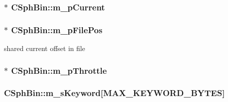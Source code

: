 \hypertarget{structCSphBin_a2cbc4fc1ca50a07597654190a3209dcf}{
\subsubsection[{m\-\_\-p\-Current}]{$\ast$ C\-Sph\-Bin\-::m\-\_\-p\-Current\hspace{0.3cm}{\ttfamily [protected]}}}\label{structCSphBin_a2cbc4fc1ca50a07597654190a3209dcf}
\hypertarget{structCSphBin_acfd4d417ade3bda7c77436723a9654ec}{
\subsubsection[{m\-\_\-p\-File\-Pos}]{$\ast$ C\-Sph\-Bin\-::m\-\_\-p\-File\-Pos\hspace{0.3cm}{\ttfamily [protected]}}}\label{structCSphBin_acfd4d417ade3bda7c77436723a9654ec}


shared current offset in file 

\hypertarget{structCSphBin_ad11523bd78eae596117257d4556a1773}{
\subsubsection[{m\-\_\-p\-Throttle}]{$\ast$ C\-Sph\-Bin\-::m\-\_\-p\-Throttle\hspace{0.3cm}{\ttfamily [protected]}}}\label{structCSphBin_ad11523bd78eae596117257d4556a1773}
\hypertarget{structCSphBin_a9751f2b14dfee0519796ddea19e2df28}{
\subsubsection[{m\-\_\-s\-Keyword}]{ C\-Sph\-Bin\-::m\-\_\-s\-Keyword\mbox{[}{\bf M\-A\-X\-\_\-\-K\-E\-Y\-W\-O\-R\-D\-\_\-\-B\-Y\-T\-E\-S}\mbox{]}\hspace{0.3cm}{\ttfamily [protected]}}}\label{structCSphBin_a9751f2b14dfee0519796ddea19e2df28}


